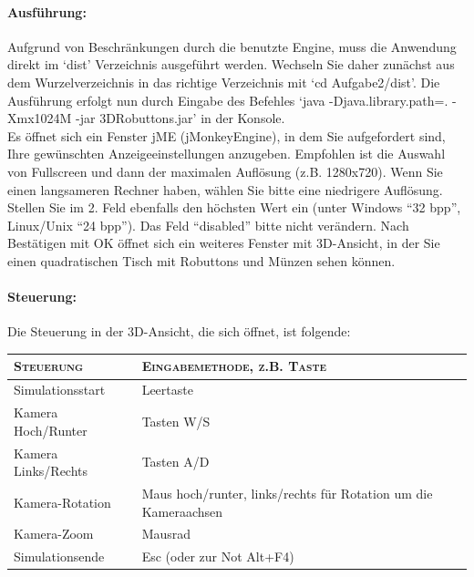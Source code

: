 \paragraph{Ausführung:}
Aufgrund von Beschränkungen durch die benutzte Engine, muss die Anwendung direkt im `dist' Verzeichnis ausgeführt werden.
Wechseln Sie daher zunächst aus dem Wurzelverzeichnis in das richtige Verzeichnis mit `cd Aufgabe2/dist'.
Die Ausführung erfolgt nun durch Eingabe des Befehles
`java -Djava.library.path=. -Xmx1024M -jar 3DRobuttons.jar' in der Konsole.\\
Es öffnet sich ein Fenster jME (jMonkeyEngine), in dem Sie aufgefordert sind, Ihre gewünschten Anzeigeeinstellungen anzugeben.
Empfohlen ist die Auswahl von Fullscreen und dann der maximalen Auflösung (z.B. 1280x720).
Wenn Sie einen langsameren Rechner haben, wählen Sie bitte eine niedrigere Auflösung.
Stellen Sie im 2. Feld ebenfalls den höchsten Wert ein (unter Windows ``32 bpp'', Linux/Unix ``24 bpp'').
Das Feld ``disabled'' bitte nicht verändern.
Nach Bestätigen mit OK öffnet sich ein weiteres Fenster mit 3D-Ansicht, in der Sie einen quadratischen Tisch mit Robuttons und Münzen sehen können.
\paragraph{Steuerung:}
Die Steuerung in der 3D-Ansicht, die sich öffnet, ist folgende: \\
\begin{center}
\begin{tabular}{ll}
\textsc{Steuerung} & \textsc{Eingabemethode, z.B. Taste} \\
\hline\hline
Simulationsstart & Leertaste \\
Kamera Hoch/Runter & Tasten W/S \\
Kamera Links/Rechts & Tasten A/D \\
Kamera-Rotation & Maus hoch/runter, links/rechts für Rotation um die Kameraachsen \\
Kamera-Zoom & Mausrad \\
Simulationsende & Esc (oder zur Not Alt+F4)
\end{tabular}
\end{center}
